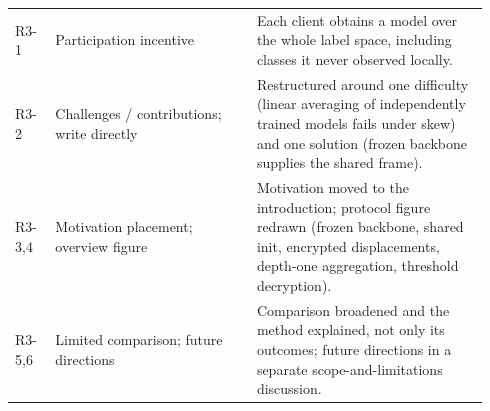 \documentclass[10pt]{article}
\begin{document}
{\begin{tabular}{@{}p{0.085\linewidth}p{0.40\linewidth}p{0.46\linewidth}@{}}
\midrule
R3-1 & Participation incentive & Each client obtains a model over the whole label space, including classes it
never observed locally. \\
R3-2 & Challenges / contributions; write directly & Restructured around one difficulty (linear averaging of
independently trained models fails under skew) and one solution (frozen backbone supplies the shared frame). \\
R3-3,4 & Motivation placement; overview figure & Motivation moved to the introduction; protocol figure redrawn
(frozen backbone, shared init, encrypted displacements, depth-one aggregation, threshold decryption). \\
R3-5,6 & Limited comparison; future directions & Comparison broadened and the method explained, not only its
outcomes; future directions in a separate scope-and-limitations discussion. \\
\bottomrule
\end{tabular}}
\end{document}
